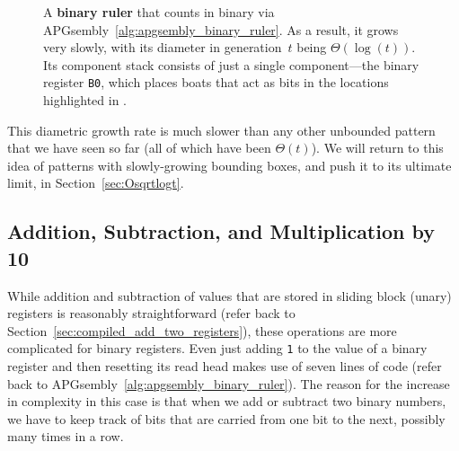 \begin{figure}[!htb]
	\centering
	\caption{A \textbf{binary ruler} that counts in binary via APGsembly~\ref{alg:apgsembly_binary_ruler}. As a result, it grows very slowly, with its diameter in generation~$t$ being $\Theta(\log(t))$. Its component stack consists of just a single component---the binary register \texttt{B0}, which places boats that act as bits in the locations highlighted in .}\label{fig:binary_ruler}
\end{figure}

This diametric growth rate is much slower than any other unbounded pattern that we have seen so far (all of which have been $\Theta(t)$). We will return to this idea of patterns with slowly-growing bounding boxes, and push it to its ultimate limit, in Section~\ref{sec:Osqrtlogt}.


\subsection{Addition, Subtraction, and Multiplication by 10}\label{sec:add_sub_and_mult10}

While addition and subtraction of values that are stored in sliding block (unary) registers is reasonably straightforward (refer back to Section~\ref{sec:compiled_add_two_registers}), these operations are more complicated for binary registers. Even just adding \texttt{1} to the value of a binary register and then resetting its read head makes use of seven lines of code (refer back to APGsembly~\ref{alg:apgsembly_binary_ruler}). The reason for the increase in complexity in this case is that when we add or subtract two binary numbers, we have to keep track of bits that are carried from one bit to the next, possibly many times in a row.

